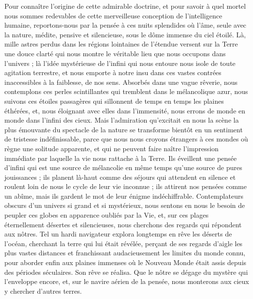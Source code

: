 \documentclass[a4paper, 11pt, oneside, landscape]{article}
\begin{document}
Pour connaître l'origine de cette admirable doctrine, et pour savoir à quel mortel nous sommes redevables de cette merveilleuse conception de l'intelligence humaine, reportons-nous par la pensée à ces nuits splendides où l'âme, seule avec la nature, médite, pensive et silencieuse, sous le dôme immense du ciel étoilé. Là, mille astres perdus dans les régions lointaines de l'étendue versent sur la Terre une douce clarté qui nous montre le véritable lieu que nous occupons dans l'univers ; là l'idée mystérieuse de l'infini qui nous entoure nous isole de toute agitation terrestre, et nous emporte à notre insu dans ces vastes contrées inaccessibles à la faiblesse, de nos sens. Absorbés dans une vague rêverie, nous contemplons ces perles scintillantes qui tremblent dans le mélancolique azur, nous suivons ces étoiles passagères qui sillonnent de temps en temps les plaines éthérées, et, nous éloignant avec elles dans l'immensité, nous errons de monde en monde dans l'infini des cieux. Mais l'admiration qu'excitait en nous la scène la plus émouvante du spectacle de la nature se transforme bientôt en un sentiment de tristesse indéfinissable, parce que nous nous croyons étrangers à ces mondes où règne une solitude apparente, et qui ne peuvent faire naître l'impression immédiate par laquelle la vie nous rattache à la Terre. Ils éveillent une pensée d'infini qui est une source de mélancolie en même temps qu'une source de pures jouissances ; ils planent là-haut comme des séjours qui attendent en silence et roulent loin de nous le cycle de leur vie inconnue ; ils attirent nos pensées comme un abîme, mais ils gardent le mot de leur énigme indéchiffrable. Contemplateurs obscurs d'un univers si grand et si mystérieux, nous sentons en nous le besoin de peupler ces globes en apparence oubliés par la Vie, et, sur ces plages éternellement désertes et silencieuses, nous cherchons des regards qui répondent aux nôtres. Tel un hardi navigateur explora longtemps en rêve les déserts de l'océan, cherchant la terre qui lui était révélée, perçant de ses regards d'aigle les plus vastes distances et franchissant audacieusement les limites du monde connu, pour aborder enfin aux plaines immenses où le Nouveau Monde était assis depuis des périodes séculaires. Son rêve se réalisa. Que le nôtre se dégage du mystère qui l'enveloppe encore, et, sur le navire aérien de la pensée, nous monterons aux cieux y chercher d'autres terres.
\end{document}
